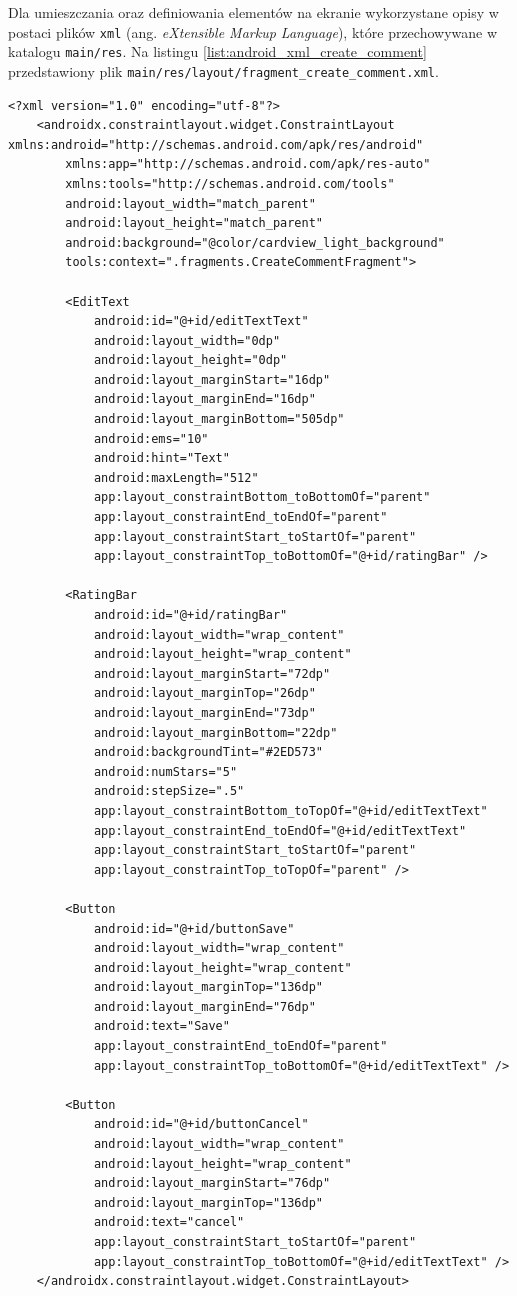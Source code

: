 Dla umieszczania oraz definiowania elementów na ekranie wykorzystane opisy w postaci plików \texttt{xml} (ang. \textit{eXtensible Markup Language}), które przechowywane w katalogu \texttt{main/res}. Na listingu \ref{list:android_xml_create_comment} przedstawiony plik \texttt{main/res/layout/fragment\_create\_comment.xml}.
\begin{lstlisting}[label=list:android_xml_create_comment,caption=Opis fragmentu tworzenia komentarza,basicstyle=\tiny\ttfamily]
    <?xml version="1.0" encoding="utf-8"?>
    <androidx.constraintlayout.widget.ConstraintLayout xmlns:android="http://schemas.android.com/apk/res/android"
        xmlns:app="http://schemas.android.com/apk/res-auto"
        xmlns:tools="http://schemas.android.com/tools"
        android:layout_width="match_parent"
        android:layout_height="match_parent"
        android:background="@color/cardview_light_background"
        tools:context=".fragments.CreateCommentFragment">
    
        <EditText
            android:id="@+id/editTextText"
            android:layout_width="0dp"
            android:layout_height="0dp"
            android:layout_marginStart="16dp"
            android:layout_marginEnd="16dp"
            android:layout_marginBottom="505dp"
            android:ems="10"
            android:hint="Text"
            android:maxLength="512"
            app:layout_constraintBottom_toBottomOf="parent"
            app:layout_constraintEnd_toEndOf="parent"
            app:layout_constraintStart_toStartOf="parent"
            app:layout_constraintTop_toBottomOf="@+id/ratingBar" />
    
        <RatingBar
            android:id="@+id/ratingBar"
            android:layout_width="wrap_content"
            android:layout_height="wrap_content"
            android:layout_marginStart="72dp"
            android:layout_marginTop="26dp"
            android:layout_marginEnd="73dp"
            android:layout_marginBottom="22dp"
            android:backgroundTint="#2ED573"
            android:numStars="5"
            android:stepSize=".5"
            app:layout_constraintBottom_toTopOf="@+id/editTextText"
            app:layout_constraintEnd_toEndOf="@+id/editTextText"
            app:layout_constraintStart_toStartOf="parent"
            app:layout_constraintTop_toTopOf="parent" />
    
        <Button
            android:id="@+id/buttonSave"
            android:layout_width="wrap_content"
            android:layout_height="wrap_content"
            android:layout_marginTop="136dp"
            android:layout_marginEnd="76dp"
            android:text="Save"
            app:layout_constraintEnd_toEndOf="parent"
            app:layout_constraintTop_toBottomOf="@+id/editTextText" />
    
        <Button
            android:id="@+id/buttonCancel"
            android:layout_width="wrap_content"
            android:layout_height="wrap_content"
            android:layout_marginStart="76dp"
            android:layout_marginTop="136dp"
            android:text="cancel"
            app:layout_constraintStart_toStartOf="parent"
            app:layout_constraintTop_toBottomOf="@+id/editTextText" />
    </androidx.constraintlayout.widget.ConstraintLayout>
\end{lstlisting}
